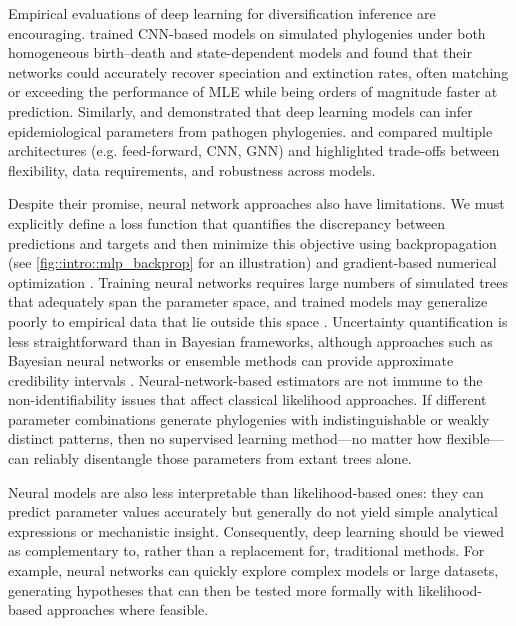 Empirical evaluations of deep learning for diversification inference are encouraging. \citet{lambert_deep_2023} trained CNN-based models on simulated phylogenies under both homogeneous birth--death and state-dependent models and found that their networks could accurately recover speciation and extinction rates, often matching or exceeding the performance of MLE while being orders of magnitude faster at prediction. Similarly, \citet{voznica_deep_2022} and \citet{reiman_popphy-cnn_2020} demonstrated that deep learning models can infer epidemiological parameters from pathogen phylogenies. \citet{lajaaiti_comparison_2023} and \citet{qin_parameter_2025} compared multiple architectures (e.g. feed-forward, CNN, GNN) and highlighted trade-offs between flexibility, data requirements, and robustness across models.



Despite their promise, neural network approaches also have limitations. We must explicitly define a loss function that quantifies the discrepancy between predictions and targets and then minimize this objective using backpropagation (see \autoref{fig::intro::mlp_backprop} for an illustration) and gradient-based numerical optimization \citep{kingma_adam_2014}. Training neural networks requires large numbers of simulated trees that adequately span the parameter space, and trained models may generalize poorly to empirical data that lie outside this space \citep{qin_parameter_2025}. Uncertainty quantification is less straightforward than in Bayesian frameworks, although approaches such as Bayesian neural networks or ensemble methods can provide approximate credibility intervals \citep{blundell_weight_2015, lakshminarayanan_simple_2017}. Neural-network-based estimators are not immune to the non-identifiability issues that affect classical likelihood approaches. If different parameter combinations generate phylogenies with indistinguishable or weakly distinct patterns, then no supervised learning method---no matter how flexible---can reliably disentangle those parameters from extant trees alone.

Neural models are also less interpretable than likelihood-based ones: they can predict parameter values accurately but generally do not yield simple analytical expressions or mechanistic insight. Consequently, deep learning should be viewed as complementary to, rather than a replacement for, traditional methods. For example, neural networks can quickly explore complex models or large datasets, generating hypotheses that can then be tested more formally with likelihood-based approaches where feasible.

